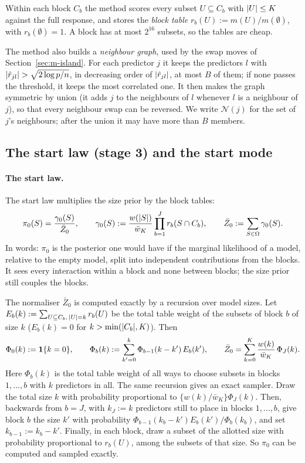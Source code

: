 \documentclass[11pt]{article}
\begin{document}
Within each block $C_b$ the method scores every subset $U\subseteq C_b$ with $\lvert U\rvert\le K$ against the full response,
and stores the \emph{block table} $r_b(U):=m(U)/m(\emptyset)$, with $r_b(\emptyset)=1$. A block has at most $2^{16}$
subsets, so the tables are cheap.

The method also builds a \emph{neighbour graph}, used by the swap moves of Section~\ref{sec:m-island}. For each predictor
$j$ it keeps the predictors $l$ with $\lvert \hat r_{jl}\rvert>\sqrt{2\log p/n}$, in decreasing order of $\lvert \hat r_{jl}\rvert$, at
most $B$ of them; if none passes the threshold, it keeps the most correlated one. It then makes the graph symmetric by
union (it adds $j$ to the neighbours of $l$ whenever $l$ is a neighbour of $j$), so that every neighbour swap can be
reversed. We write $\mathcal N(j)$ for the set of $j$'s neighbours; after the union it may have more than $B$ members.

\subsection{The start law (stage 3) and the start mode}\label{sec:m-start}

\paragraph{The start law.} The start law multiplies the size prior by the block tables:
\begin{equation}\label{eq:m-startlaw}
  \pi_0(S)=\frac{\gamma_0(S)}{\bar Z_0},\qquad \gamma_0(S):=\frac{w(\lvert S\rvert)}{\bar w_K}\prod_{b=1}^J r_b(S\cap C_b),\qquad
  \bar Z_0:=\sum_{S\in\Omega}\gamma_0(S).
\end{equation}
In words: $\pi_0$ is the posterior one would have if the marginal likelihood of a model, relative to the empty model, split
into independent contributions from the blocks. It sees every interaction within a block and none between blocks; the size prior still couples the blocks.

The normaliser $\bar Z_0$ is computed exactly by a recursion over model sizes. Let $E_b(k):=\sum_{U\subseteq C_b,\,\lvert U\rvert=k}
r_b(U)$ be the total table weight of the subsets of block $b$ of size $k$ ($E_b(k)=0$ for $k>\min(\lvert C_b\rvert,K)$). Then
\[
  \Phi_0(k):=\mathbf{1}\{k=0\},\qquad \Phi_b(k):=\sum_{k'=0}^{k}\Phi_{b-1}(k-k')\,E_b(k'),\qquad
  \bar Z_0=\sum_{k=0}^{K}\frac{w(k)}{\bar w_K}\,\Phi_J(k).
\]
Here $\Phi_b(k)$ is the total table weight of all ways to choose subsets in blocks $1,\dots,b$ with $k$ predictors in all.
The same recursion gives an exact sampler. Draw the total size $k$ with probability proportional to
$\{w(k)/\bar w_K\}\Phi_J(k)$. Then, backwards from $b=J$, with $k_J:=k$ predictors still to place in blocks $1,\dots,b$,
give block $b$ the size $k'$ with probability $\Phi_{b-1}(k_b-k')E_b(k')/\Phi_b(k_b)$, and set $k_{b-1}:=k_b-k'$. Finally,
in each block, draw a subset of the allotted size with probability proportional to $r_b(U)$, among the subsets of that
size. So $\pi_0$ can be computed and sampled exactly.
\end{document}
